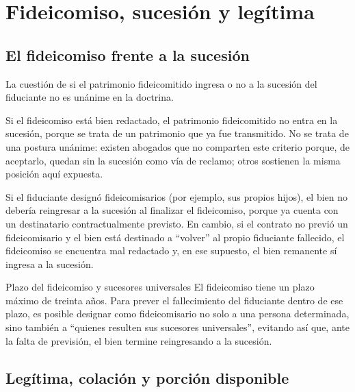 \documentclass[12pt,oneside]{book}
\begin{document}
\chapter{Fideicomiso, sucesión y legítima}

\section{El fideicomiso frente a la sucesión}

La cuestión de si el patrimonio fideicomitido ingresa o no a la sucesión del fiduciante no es unánime en la doctrina.

\begin{important}
Si el fideicomiso está bien redactado, el patrimonio fideicomitido no entra en la sucesión, porque se trata de un patrimonio que ya fue transmitido. No se trata de una postura unánime: existen abogados que no comparten este criterio porque, de aceptarlo, quedan sin la sucesión como vía de reclamo; otros sostienen la misma posición aquí expuesta.
\end{important}

Si el fiduciante designó fideicomisarios (por ejemplo, sus propios hijos), el bien no debería reingresar a la sucesión al finalizar el fideicomiso, porque ya cuenta con un destinatario contractualmente previsto. En cambio, si el contrato no previó un fideicomisario y el bien está destinado a ``volver'' al propio fiduciante fallecido, el fideicomiso se encuentra mal redactado y, en ese supuesto, el bien remanente sí ingresa a la sucesión.

\begin{definition}{Plazo del fideicomiso y sucesores universales}
El fideicomiso tiene un plazo máximo de treinta años. Para prever el fallecimiento del fiduciante dentro de ese plazo, es posible designar como fideicomisario no solo a una persona determinada, sino también a ``quienes resulten sus sucesores universales'', evitando así que, ante la falta de previsión, el bien termine reingresando a la sucesión.
\end{definition}

\section{Legítima, colación y porción disponible}
\end{document}
